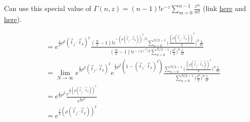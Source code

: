 \documentclass[12pt]{article}
\newcommand{\ptjtk}{\rho(\vec{t}_j\cdot\vec{t}_k)}
\newcommand{\tjtk}{(\vec{t}_j\cdot\vec{t}_k)}
\begin{document}
Can use this special value of $\Gamma(n,z) = (n-1)!e^{-z}\sum^{n-1}_{m=0} \frac{z^m}{m!}$ (link \href{http://functions.wolfram.com/GammaBetaErf/Gamma2/03/01/02/0007/}{here} and \href{https://en.wikipedia.org/wiki/Incomplete_gamma_function#Special_values}{here}).

   \begin{align}
   &= e^{\frac{1}{2}\rho^2\tjtk^2} \frac{(\frac{N}{2}-1)!e^{-(\ptjtk)^2/2}\sum^{N/2-1}_{n=0} \Big(\frac{(\ptjtk)^2}{2}\Big)^{n}\frac{1}{n!} } 
   {(\frac{N}{2}-1)!e^{-(\rho)^2/2}\sum^{N/2-1}_{n=0} \Big(\frac{\rho^2}{2}\Big)^{n}\frac{1}{n!} } \\
   &= \lim_{N\rightarrow\infty} e^{\frac{1}{2}\rho^2\tjtk^2} e^{\frac{1}{2}\rho^2(1-\tjtk^2)}
   \frac{\sum^{N/2-1}_{n=0} \Big(\frac{(\ptjtk)^2}{2}\Big)^{n}\frac{1}{n!} } 
   {\sum^{N/2-1}_{n=0} \Big(\frac{\rho^2}{2}\Big)^{n}\frac{1}{n!} } \\
   &= e^{\frac{1}{2}\rho^2} \frac{e^{\frac{1}{2}(\ptjtk)^2}}{e^{\frac{1}{2}\rho^2}} \\
   & = e^{\frac{1}{2}(\ptjtk)^2} 
   \end{align}

\end{document}
